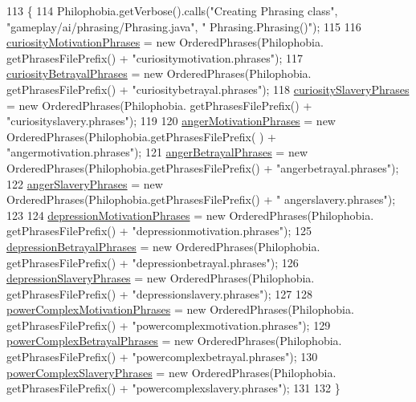 \begin{DoxyCode}
113                       \{
114         Philophobia.getVerbose().calls(\textcolor{stringliteral}{"Creating Phrasing class"}, \textcolor{stringliteral}{"gameplay/ai/phrasing/Phrasing.java"}, \textcolor{stringliteral}{"
      Phrasing.Phrasing()"});
115 
116         \hyperlink{a00018_ad82ede6d0263d91e13511606f6696a18}{curiosityMotivationPhrases} = \textcolor{keyword}{new} OrderedPhrases(Philophobia.
      getPhrasesFilePrefix() + \textcolor{stringliteral}{"curiositymotivation.phrases"});
117         \hyperlink{a00018_a10f436b3727af6eedab39a382801306c}{curiosityBetrayalPhrases} = \textcolor{keyword}{new} OrderedPhrases(Philophobia.
      getPhrasesFilePrefix() + \textcolor{stringliteral}{"curiositybetrayal.phrases"});
118         \hyperlink{a00018_a2e35ff33685cec980af1454e7f255d06}{curiositySlaveryPhrases} = \textcolor{keyword}{new} OrderedPhrases(Philophobia.
      getPhrasesFilePrefix() + \textcolor{stringliteral}{"curiosityslavery.phrases"});
119         
120         \hyperlink{a00018_a2fb3c3c2b96efbc4afee915d58967130}{angerMotivationPhrases} = \textcolor{keyword}{new} OrderedPhrases(Philophobia.getPhrasesFilePrefix(
      ) + \textcolor{stringliteral}{"angermotivation.phrases"});
121         \hyperlink{a00018_a69df7c3975018f12a43f29172bbc5789}{angerBetrayalPhrases} = \textcolor{keyword}{new} OrderedPhrases(Philophobia.getPhrasesFilePrefix() + \textcolor{stringliteral}{
      "angerbetrayal.phrases"});
122         \hyperlink{a00018_a1c50856055990e9a1c22fd2b364bdf85}{angerSlaveryPhrases} = \textcolor{keyword}{new} OrderedPhrases(Philophobia.getPhrasesFilePrefix() + \textcolor{stringliteral}{"
      angerslavery.phrases"});
123 
124         \hyperlink{a00018_a7134cba12ee037a9737e6e5dcdc02ba8}{depressionMotivationPhrases} = \textcolor{keyword}{new} OrderedPhrases(Philophobia.
      getPhrasesFilePrefix() + \textcolor{stringliteral}{"depressionmotivation.phrases"});
125         \hyperlink{a00018_a1ab28780f3cb894c496ebd26185493aa}{depressionBetrayalPhrases} = \textcolor{keyword}{new} OrderedPhrases(Philophobia.
      getPhrasesFilePrefix() + \textcolor{stringliteral}{"depressionbetrayal.phrases"});
126         \hyperlink{a00018_ab8f4fdd33f163351fb6ff578cb950a44}{depressionSlaveryPhrases} = \textcolor{keyword}{new} OrderedPhrases(Philophobia.
      getPhrasesFilePrefix() + \textcolor{stringliteral}{"depressionslavery.phrases"});
127 
128         \hyperlink{a00018_ad566ad78166872e95e920833f4f36e90}{powerComplexMotivationPhrases} = \textcolor{keyword}{new} OrderedPhrases(Philophobia.
      getPhrasesFilePrefix() + \textcolor{stringliteral}{"powercomplexmotivation.phrases"});
129         \hyperlink{a00018_a77e67b74525c919463d3c9b830fe895d}{powerComplexBetrayalPhrases} = \textcolor{keyword}{new} OrderedPhrases(Philophobia.
      getPhrasesFilePrefix() + \textcolor{stringliteral}{"powercomplexbetrayal.phrases"});
130         \hyperlink{a00018_afc6cf63da008d88b88e0e8138bb2fda9}{powerComplexSlaveryPhrases} = \textcolor{keyword}{new} OrderedPhrases(Philophobia.
      getPhrasesFilePrefix() + \textcolor{stringliteral}{"powercomplexslavery.phrases"});
131 
132     \}
\end{DoxyCode}


